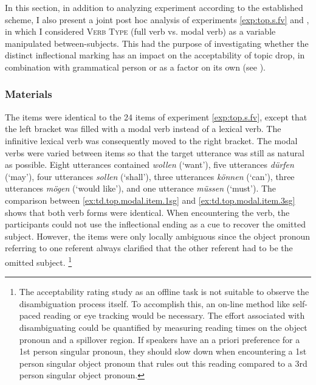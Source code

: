 In this section, in addition to analyzing experiment  according to the established scheme, I also present a joint post hoc analysis of experiments \ref*{exp:top.s.fv} and , in which I considered \textsc{Verb Type} (full verb vs. modal verb) as a variable manipulated between-subjects.
This had the purpose of investigating whether the distinct inflectional marking has an impact on the acceptability of topic drop, in combination with grammatical person or as a factor on its own (see ).

\largerpage[2]
\subsubsection{Materials}\label{sec:exp.top.s.mv.materials}
The items were identical to the 24 items of experiment \ref*{exp:top.s.fv}, except that the left bracket was filled with a modal verb  instead of a lexical verb.
The infinitive lexical verb was consequently moved to the right bracket.
The modal verbs  were varied between items so that the target utterance was still as natural as possible.
Eight utterances contained \textit{wollen} (`want'), five utterances \textit{dürfen} (`may'), four utterances \textit{sollen} (`shall'), three utterances \textit{können} (`can'), three utterances \textit{mögen} (`would like'), and one utterance \textit{müssen} (`must').
The comparison between \ref{ex:td.top.modal.item.1sg} and \ref{ex:td.top.modal.item.3sg} shows that both verb forms were identical.
When encountering the verb, the participants could not use the inflectional ending as a cue to recover  the omitted subject.
However, the items were only locally ambiguous  since the object pronoun referring to one referent always clarified that the other referent had to be the omitted subject.%
\footnote{The acceptability rating study as an offline task is not suitable to observe the disambiguation  process itself.
To accomplish this, an on-line method like self-paced reading or eye tracking would be necessary.
The effort  associated with disambiguating could be quantified by measuring reading times on the object pronoun and a spillover region.
If speakers have an a priori preference for a 1st person singular pronoun, they should slow down when encountering a 1st person singular object pronoun that rules out this reading compared to a 3rd person singular object pronoun.
}
%

